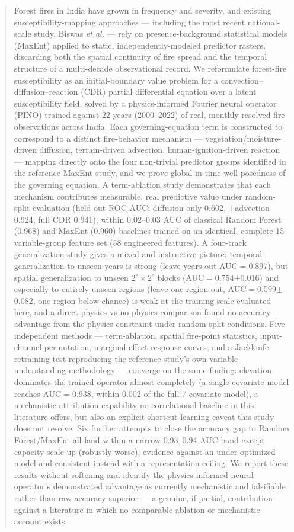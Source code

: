 \documentclass[journal]{IEEEtran}
\begin{document}
\begin{abstract}
Forest fires in India have grown in frequency and severity, and existing susceptibility-mapping approaches --- including the most recent national-scale study, Biswas \emph{et al.} \cite{biswas2025} --- rely on presence-background statistical models (MaxEnt) applied to static, independently-modeled predictor rasters, discarding both the spatial continuity of fire spread and the temporal structure of a multi-decade observational record. We reformulate forest-fire susceptibility as an initial-boundary value problem for a convection--diffusion--reaction (CDR) partial differential equation over a latent susceptibility field, solved by a physics-informed Fourier neural operator (PINO) trained against 22 years (2000--2022) of real, monthly-resolved fire observations across India. Each governing-equation term is constructed to correspond to a distinct fire-behavior mechanism --- vegetation/moisture-driven diffusion, terrain-driven advection, human-ignition-driven reaction --- mapping directly onto the four non-trivial predictor groups identified in the reference MaxEnt study, and we prove global-in-time well-posedness of the governing equation. A term-ablation study demonstrates that each mechanism contributes measurable, real predictive value under random-split evaluation (held-out ROC-AUC: diffusion-only 0.602, $+$advection 0.924, full CDR 0.941), within 0.02--0.03 AUC of classical Random Forest (0.968) and MaxEnt (0.960) baselines trained on an identical, complete 15-variable-group feature set (58 engineered features). A four-track generalization study gives a mixed and instructive picture: temporal generalization to unseen years is strong (leave-years-out AUC$=$0.897), but spatial generalization to unseen $2^{\circ}\times2^{\circ}$ blocks (AUC$=$0.754$\pm$0.016) and especially to entirely unseen regions (leave-one-region-out, AUC$=$0.599$\pm$0.082, one region below chance) is weak at the training scale evaluated here, and a direct physics-vs-no-physics comparison found no accuracy advantage from the physics constraint under random-split conditions. Five independent methods --- term-ablation, spatial fire-point statistics, input-channel permutation, marginal-effect response curves, and a Jackknife retraining test reproducing the reference study's own variable-understanding methodology --- converge on the same finding: elevation dominates the trained operator almost completely (a single-covariate model reaches AUC$=$0.938, within 0.002 of the full 7-covariate model), a mechanistic attribution capability no correlational baseline in this literature offers, but also an explicit shortcut-learning caveat this study does not resolve. Six further attempts to close the accuracy gap to Random Forest/MaxEnt all land within a narrow 0.93--0.94 AUC band except capacity scale-up (robustly worse), evidence against an under-optimized model and consistent instead with a representation ceiling. We report these results without softening and identify the physics-informed neural operator's demonstrated advantage as currently mechanistic and falsifiable rather than raw-accuracy-superior --- a genuine, if partial, contribution against a literature in which no comparable ablation or mechanistic account exists.
\end{abstract}
\end{document}
